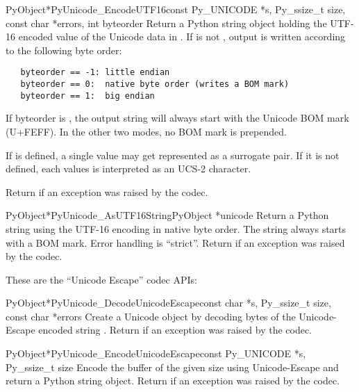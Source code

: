 \begin{cfuncdesc}{PyObject*}{PyUnicode_EncodeUTF16}{const Py_UNICODE *s,
                                               Py_ssize_t size,
                                               const char *errors,
                                               int byteorder}
  Return a Python string object holding the UTF-16 encoded value of
  the Unicode data in .  If  is not ,
  output is written according to the following byte order:

\begin{verbatim}
   byteorder == -1: little endian
   byteorder == 0:  native byte order (writes a BOM mark)
   byteorder == 1:  big endian
\end{verbatim}

  If byteorder is , the output string will always start with
  the Unicode BOM mark (U+FEFF). In the other two modes, no BOM mark
  is prepended.

  If  is defined, a single 
  value may get represented as a surrogate pair. If it is not
  defined, each  values is interpreted as an
  UCS-2 character.

  Return \NULL{} if an exception was raised by the codec.
\end{cfuncdesc}

\begin{cfuncdesc}{PyObject*}{PyUnicode_AsUTF16String}{PyObject *unicode}
  Return a Python string using the UTF-16 encoding in native byte
  order. The string always starts with a BOM mark.  Error handling is
  ``strict''.  Return \NULL{} if an exception was raised by the
  codec.
\end{cfuncdesc}


These are the ``Unicode Escape'' codec APIs:

\begin{cfuncdesc}{PyObject*}{PyUnicode_DecodeUnicodeEscape}{const char *s,
                                               Py_ssize_t size,
                                               const char *errors}
  Create a Unicode object by decoding  bytes of the
  Unicode-Escape encoded string .  Return \NULL{} if an
  exception was raised by the codec.
\end{cfuncdesc}

\begin{cfuncdesc}{PyObject*}{PyUnicode_EncodeUnicodeEscape}{const Py_UNICODE *s,
                                               Py_ssize_t size}
  Encode the  buffer of the given size using
  Unicode-Escape and return a Python string object.  Return \NULL{}
  if an exception was raised by the codec.
\end{cfuncdesc}

